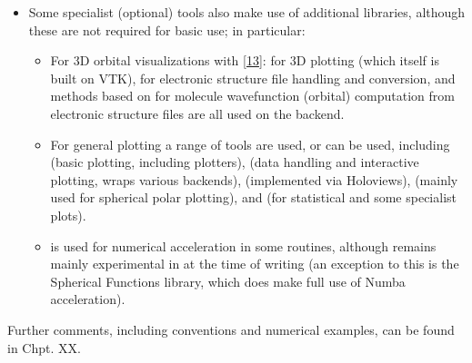 \documentclass[letterpaper,table,10pt,english]{jupyterBook}
\begin{document}
\begin{itemize}
\item {} 
\sphinxAtStartPar
Some specialist (optional) tools also make use of additional libraries, although these are not required for basic use; in particular:
\begin{itemize}
\item {} 
\sphinxAtStartPar
For 3D orbital visualizations with  {[}\hyperlink{cite.backmatter/bibliography:id547}{13}{]}:  for 3D plotting (which itself is built on VTK),  for electronic structure file handling and conversion, and methods based on  for molecule wavefunction (orbital) computation from electronic structure files are all used on the backend.

\item {} 
\sphinxAtStartPar
For general plotting a range of tools are used, or can be used, including  (basic plotting, including  plotters),  (data handling and interactive plotting, wraps various backends),  (implemented via Holoviews),  (mainly used for spherical polar plotting), and  (for statistical and some specialist plots).

\item {} 
\sphinxAtStartPar
{} is used for numerical acceleration in some routines, although remains mainly experimental in  at the time of writing (an exception to this is the Spherical Functions library, which does make full use of Numba acceleration).

\end{itemize}

\end{itemize}

\sphinxAtStartPar
Further comments, including conventions and numerical examples, can be found in Chpt. XX.
\end{document}
